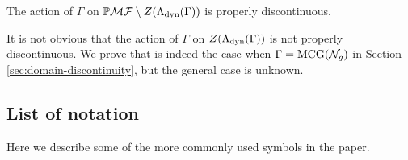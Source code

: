 \documentclass[12pt, reqno]{amsart}
\begin{document}
\begin{untheorem}
  The action of $\Gamma$ on $\mathbb{P}\mathcal{MF} \setminus Z(\Lambda_{\mathrm{dyn}}(\Gamma))$ is properly discontinuous.
\end{untheorem}

It is not obvious that the action of $\Gamma$ on $Z(\Lambda_{\mathrm{dyn}}(\Gamma))$ is not properly discontinuous.
We prove that is indeed the case when $\Gamma = \mathrm{MCG}(\mathcal{N}_g)$ in Section \ref{sec:domain-discontinuity}, but the general case is unknown.


\subsection*{List of notation}
Here we describe some of the more commonly used symbols in the paper.
\end{document}

